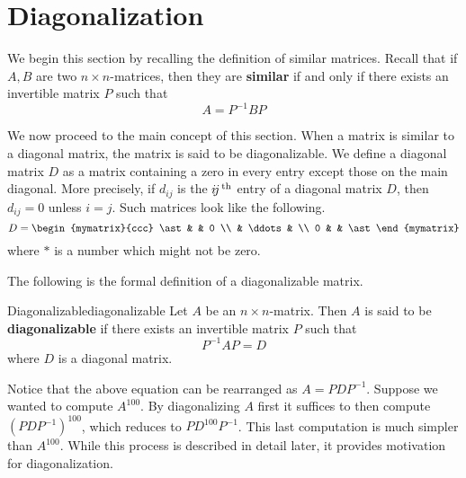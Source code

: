 \section{Diagonalization}

We begin this section by recalling the definition of similar matrices.
Recall that if $A,B$ are two $n\times n$-matrices, then they are
\textbf{similar} if and only if there exists
an invertible matrix $P$ such that
\begin{equation*}
  A=P^{-1}BP
\end{equation*}

We now proceed to the main concept of this section. When a matrix is
similar to a diagonal matrix, the matrix is said to be
diagonalizable.  We define a diagonal matrix $D$
as a matrix containing a zero in every entry except those on the main
diagonal. More precisely, if $d_{ij}$ is the $i\!j^{\,\rm th}$ entry of a
diagonal matrix $D$, then $d_{ij}=0$ unless $i=j$. Such matrices look
like the following.
\begin{equation*}
  D = \begin{mymatrix}{ccc}
    \ast &  & 0 \\
    & \ddots &  \\
    0 &  & \ast
  \end{mymatrix}
\end{equation*}
where $\ast $ is a number which might not be zero.

The following is the formal definition of a diagonalizable matrix.

\begin{definition}{Diagonalizable}{diagonalizable}
  Let $A$ be an $n\times n$-matrix. Then $A$ is said to be
  \textbf{diagonalizable} if there exists an
  invertible matrix $P$ such that
  \begin{equation*}
    P^{-1}AP=D
  \end{equation*}
  where $D$ is a diagonal matrix.
\end{definition}

Notice that the above equation can be rearranged as
$A=PDP^{-1}$. Suppose we wanted to compute $A^{100}$. By diagonalizing
$A$ first it suffices to then compute $(PDP^{-1})^{100}$, which
reduces to $PD^{100}P^{-1}$. This last computation is much simpler
than $A^{100}$. While this process is described in detail later, it
provides motivation for diagonalization.

